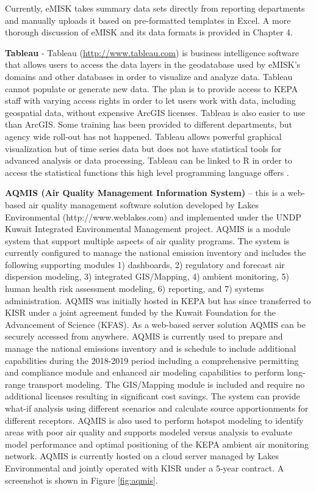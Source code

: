 Currently, eMISK takes summary data sets directly from reporting departments and manually uploads it based on pre-formatted templates in Excel. A more thorough discussion of eMISK and its data formats is provided in Chapter 4.

\textbf{Tableau} - Tableau (\url{http://www.tableau.com}) is business intelligence software that allows users to access the data layers in the geodatabase used by eMISK's domains and other databases in order to visualize and analyze data. Tableau cannot populate or generate new data. The plan is to provide access to KEPA staff with varying access rights in order to let users work with data, including geospatial data, without expensive ArcGIS licenses. Tableau is also easier to use than ArcGIS. Some training has been provided to different departments, but agency wide roll-out has not happened. Tableau allows powerful graphical visualization but of time series data but does not have statistical tools for advanced analysis or data processing. Tableau can be linked to R in order to access the statistical functions this high level programming language offers \citep{tableau2018}. 

\textbf{AQMIS (Air Quality Management Information System)} – this is a web-based air quality management software solution developed by Lakes Environmental (http://www.weblakes.com) and implemented under the UNDP Kuwait Integrated Environmental Management project. AQMIS is a module system that support multiple aspects of air quality programs.  The system is currently configured to manage the national emission inventory and includes the following supporting modules 1) dashboards, 2) regulatory and forecast air dispersion modeling, 3) integrated GIS/Mapping, 4) ambient monitoring, 5) human health risk assessment modeling, 6) reporting, and 7) systems administration.  AQMIS was initially hosted in KEPA but has since transferred to KISR under a joint agreement funded by the Kuwait Foundation for the Advancement of Science (KFAS). As a web-based server solution AQMIS can be securely accessed from anywhere. AQMIS is currently  used to prepare and manage the national emissions inventory and is schedule to include additional capabilities during the 2018-2019 period including a comprehensive permitting and compliance module and enhanced air modeling capabilities to perform long-range transport modeling.  The GIS/Mapping module is included and require no additional licenses resulting in significant cost savings.  The system can provide what-if analysis using different scenarios and calculate source apportionments for different receptors. AQMIS is also used to perform hotspot modeling to identify areas with poor air quality and supports modeled versus analysis to evaluate model performance and optimal positioning of the KEPA ambient air monitoring network.  AQMIS is currently hosted on a cloud server managed by Lakes Environmental and jointly operated with KISR under a 5-year contract. A screenshot is shown in Figure \ref{fig:aqmis}.

